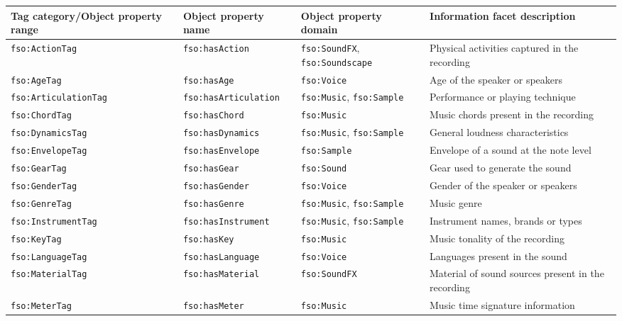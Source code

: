 \begin{table}
\tiny
\begin{center}
\footnotesize
\begin{tabular}{@{}p{3.4cm}lp{4.6cm}l@{}}
\toprule
\textbf{Tag category/Object property range} & \textbf{Object property name} & \textbf{Object property domain} & \textbf{Information facet description} \\ 
\midrule 
\texttt{fso:ActionTag} & \texttt{fso:hasAction} & \texttt{fso:SoundFX}, \texttt{fso:Soundscape} & Physical activities captured in the recording \\
\texttt{fso:AgeTag} & \texttt{fso:hasAge} & \texttt{fso:Voice} & Age of the speaker or speakers \\
\texttt{fso:ArticulationTag} & \texttt{fso:hasArticulation} & \texttt{fso:Music}, \texttt{fso:Sample} & Performance or playing technique \\
\texttt{fso:ChordTag} & \texttt{fso:hasChord} & \texttt{fso:Music} & Music chords present in the recording \\
\texttt{fso:DynamicsTag} & \texttt{fso:hasDynamics} & \texttt{fso:Music}, \texttt{fso:Sample} & General loudness characteristics \\
\texttt{fso:EnvelopeTag} & \texttt{fso:hasEnvelope} & \texttt{fso:Sample} & Envelope of a sound at the note level \\
\texttt{fso:GearTag} & \texttt{fso:hasGear} & \texttt{fso:Sound} & Gear used to generate the sound \\
\texttt{fso:GenderTag} & \texttt{fso:hasGender} & \texttt{fso:Voice} & Gender of the speaker or speakers \\
\texttt{fso:GenreTag} & \texttt{fso:hasGenre} & \texttt{fso:Music}, \texttt{fso:Sample} & Music genre \\
\texttt{fso:InstrumentTag} & \texttt{fso:hasInstrument} & \texttt{fso:Music}, \texttt{fso:Sample} & Instrument names, brands or types \\
\texttt{fso:KeyTag} & \texttt{fso:hasKey} & \texttt{fso:Music} &  Music tonality of the recording  \\
\texttt{fso:LanguageTag} & \texttt{fso:hasLanguage} & \texttt{fso:Voice} & Languages present in the sound \\
\texttt{fso:MaterialTag} & \texttt{fso:hasMaterial} & \texttt{fso:SoundFX} & Material of sound sources present in the recording \\
\texttt{fso:MeterTag} & \texttt{fso:hasMeter} & \texttt{fso:Music} &  Music time signature information \\

\end{tabular}
\end{center}
\end{table}
